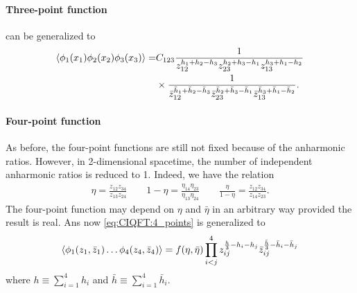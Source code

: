 \documentclass[10pt]{article}
\begin{document}
\paragraph{Three-point function}
 can be generalized to
\begin{align}
    \expval{\phi_1(x_1)\phi_2(x_2)\phi_3(x_3)}= & C_{123}\frac{1}{z_{12}^{h_1+h_2-h_3}z_{23}^{h_2+h_3-h_1}z_{13}^{h_3+h_1-h_2}}\notag                                                                   \\
                                                & \times\frac{1}{\bar{z}_{12}^{\bar{h}_1+\bar{h}_2-\bar{h}_3}\bar{z}_{23}^{\bar{h}_2+\bar{h}_3-\bar{h}_1}\bar{z}_{13}^{\bar{h}_3+\bar{h}_1-\bar{h}_2}}.
\end{align}
\paragraph{Four-point function}
As before, the four-point functions are still not fixed because of the anharmonic ratios.
However, in 2-dimensional spacetime, the number of independent anharmonic ratios is reduced to 1.
Indeed, we have the relation
\begin{align}
    \eta=\frac{z_{12}z_{34}}{z_{13}z_{24}}\quad\quad1-\eta=\frac{\eta_{14}\eta_{23}}{\eta_{13}\eta_{24}}\quad\quad\frac{\eta}{1-\eta}=\frac{z_{12}z_{34}}{z_{14}z_{23}}.
\end{align}
The four-point function may depend on $\eta$ and $\bar{\eta}$ in an arbitrary way provided the result is real.
Ans now \cref{eq:CIQFT:4_points} is generalized to
\begin{align}
    \expval{\phi_1(z_1,\bar{z}_1)\dots\phi_4(z_4,\bar{z}_4)}=f(\eta,\bar{\eta})\prod_{i<j}^4 z_{ij}^{\frac{h}{3}-h_i-h_j}\bar{z}_{ij}^{\frac{\bar{h}}{3}-\bar{h}_i-\bar{h}_j}
\end{align}
where $h\equiv\sum_{i=1}^4 h_i$ and $\bar{h}\equiv\sum_{i=1}^4\bar{h}_i$.
\end{document}
